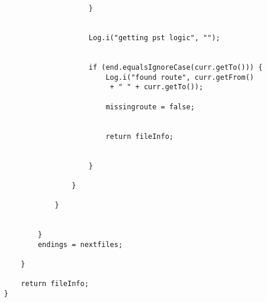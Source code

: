 \begin{lstlisting}
                        }


                        Log.i("getting pst logic", "");


                        if (end.equalsIgnoreCase(curr.getTo())) { 
                            Log.i("found route", curr.getFrom()
                             + " " + curr.getTo());

                            missingroute = false;


                            return fileInfo;


                        }

                    }

                }


            }
            endings = nextfiles;

        }

        return fileInfo;
    }
\end{lstlisting}